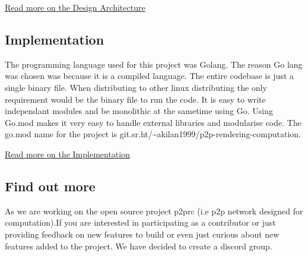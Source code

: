 \documentclass[11pt]{article}
\begin{document}
\href{Docs/DesignArchtectureIntro.md}{Read more on the Design
Architecture}

\subsection{Implementation}
\label{sec:orgd4b0943}
The programming language used for this project was Golang. The reason Go
lang was chosen was because it is a compiled language. The entire
codebase is just a single binary file. When distributing to other linux
distributing the only requirement would be the binary file to run the
code. It is easy to write independant modules and be monolithic at the
sametime using Go. Using Go.mod makes it very easy to handle external
libraries and modularise code. The go.mod name for the project is
git.sr.ht/\textasciitilde{}akilan1999/p2p-rendering-computation.

\href{Docs/Implementation.md}{Read more on the Implementation}

\subsection{Find out more}
\label{sec:orge8fec0a}
As we are working on the open source project p2prc (i.e p2p network
designed for computation).If you are interested in participating as a
contributor or just providing feedback on new features to build or even
just curious about new features added to the project. We have decided to
create a discord group.
\end{document}
